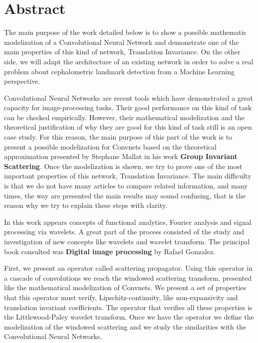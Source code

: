 %

\chapter{Abstract}

\noindent The main purpose of the work detailed below is to show a possible mathematic modelization of a Convolutional Neural Network and demonstrate one of the main properties of this kind of network, Translation Invariance.  On the other side, we will adapt the architecture of an existing network in order to solve a real problem about cephalometric landmark detection from a Machine Learning perspective.

\medskip

\noindent Convolutional Neural Networks are recent tools which have demonstrated a great capacity for image-processing tasks. Their good performance on this kind of task can be checked empirically. However, their mathematical modelization and the theoretical justification of why they are good for this kind of task still is an open case study. For this reason, the main purpose of this part of the work is to present a possible modelization for Convnets based on the theoretical approximation presented by Stephane Mallat in his work \textbf{Group Invariant Scattering}. Once the modelization is shown, we try to prove one of the most important properties of this network, Translation Invariance. The main difficulty is that we do not have many articles to compare related information, and many times, the way are presented the main results may sound confusing, that is the reason why we try to explain these steps with clarity.

\medskip

\noindent In this work appears concepts of functional analytics, Fourier analysis and signal processing via wavelets.  A great part of the process consisted of the study and investigation of new concepts like wavelets and wavelet transform. The principal book consulted was \textbf{Digital image processing} by Rafael Gonzalez.

\medskip

\noindent First, we present an operator called scattering propagator. Using this operator in a cascade of convolutions we reach the windowed scattering transform, presented like the mathematical modelization of Convnets. We present a set of properties that this operator must verify, Lipschitz-continuity, like non-expansivity and translation invariant coefficients. The operator that verifies all these properties is the Littlewood-Paley wavelet transform. Once we have the operator we define the modelization of the windowed scattering and we study the similarities with the Convolutional Neural Networks. 

